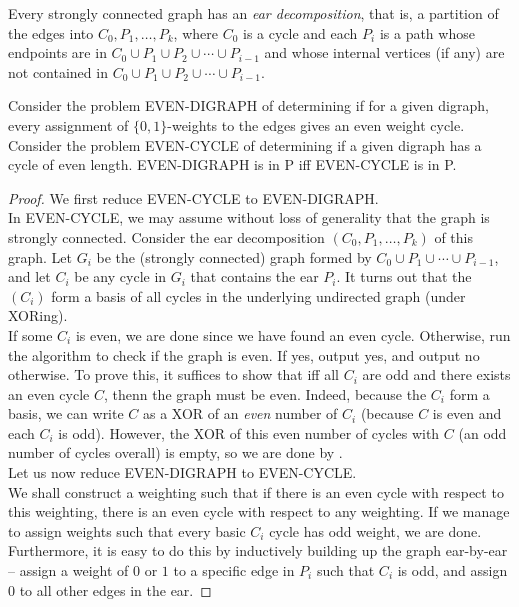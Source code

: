 \begin{fprop}
	Every strongly connected graph has an \emph{ear decomposition}, that is, a partition of the edges into $C_0,P_1,\ldots,P_k$, where $C_0$ is a cycle and each $P_i$ is a path whose endpoints are in $C_0 \cup P_1 \cup P_2 \cup \cdots \cup P_{i-1}$ and whose internal vertices (if any) are not contained in $C_0 \cup P_1 \cup P_2 \cup \cdots \cup P_{i-1}$.
\end{fprop}

\begin{ftheo}
	Consider the problem EVEN-DIGRAPH of determining if for a given digraph, every assignment of $\{0,1\}$-weights to the edges gives an even weight cycle. Consider the problem EVEN-CYCLE of determining if a given digraph has a cycle of even length. EVEN-DIGRAPH is in \textsf{P} iff EVEN-CYCLE is in \textsf{P}.
\end{ftheo}
\begin{proof}
	We first reduce EVEN-CYCLE to EVEN-DIGRAPH.\\
	In EVEN-CYCLE, we may assume without loss of generality that the graph is strongly connected. Consider the ear decomposition $(C_0,P_1,\ldots,P_k)$ of this graph. Let $G_i$ be the (strongly connected) graph formed by $C_0 \cup P_1 \cup \cdots \cup P_{i-1}$, and let $C_i$ be any cycle in $G_i$ that contains the ear $P_i$. It turns out that the $(C_i)$ form a basis of all cycles in the underlying undirected graph (under XORing).\\
	If some $C_i$ is even, we are done since we have found an even cycle. Otherwise, run the algorithm to check if the graph is even. If yes, output yes, and output no otherwise. To prove this, it suffices to show that iff all $C_i$ are odd and there exists an even cycle $C$, thenn the graph must be even. Indeed, because the $C_i$ form a basis, we can write $C$ as a XOR of an \emph{even} number of $C_i$ (because $C$ is even and each $C_i$ is odd). However, the XOR of this even number of cycles with $C$ (an odd number of cycles overall) is empty, so we are done by .\\

	Let us now reduce EVEN-DIGRAPH to EVEN-CYCLE.\\
	We shall construct a weighting such that if there is an even cycle with respect to this weighting, there is an even cycle with respect to any weighting. If we manage to assign weights such that every basic $C_i$ cycle has odd weight, we are done. Furthermore, it is easy to do this by inductively building up the graph ear-by-ear -- assign a weight of $0$ or $1$ to a specific edge in $P_i$ such that $C_i$ is odd, and assign $0$ to all other edges in the ear.
\end{proof}

